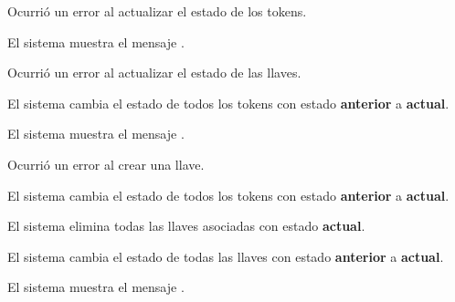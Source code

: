 {  \begin{trayectoriaAlternativa}
    {Ocurrió un error al actualizar el estado de los tokens.}

    \item El sistema muestra el mensaje
      .


  \end{trayectoriaAlternativa}

  \begin{trayectoriaAlternativa}
    {Ocurrió un error al actualizar el estado de las llaves.}

    \item El sistema cambia el estado de todos los tokens con estado
      \textbf{anterior} a \textbf{actual}.

    \item El sistema muestra el mensaje
      .


  \end{trayectoriaAlternativa}

  \begin{trayectoriaAlternativa}
    {Ocurrió un error al crear una llave.}

    \item El sistema cambia el estado de todos los tokens con estado
      \textbf{anterior} a \textbf{actual}.

    \item El sistema elimina todas las llaves asociadas con estado
      \textbf{actual}.

    \item El sistema cambia el estado de todas las llaves con estado
      \textbf{anterior} a \textbf{actual}.

    \item El sistema muestra el mensaje
      .


\end{trayectoriaAlternativa}}
